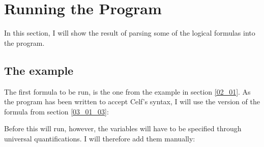 \section{Running the Program}
\label{04_03}

In this section, I will show the result of parsing some of the logical formulas into the program.

\subsection{The example}

The first formula to be run, is the one from the example in section \ref{02_01}. As the program has been written to accept Celf's syntax, I will use the version of the formula from section \ref{03_01_03}:

\begin{texto}
\end{texto}

 Before this will run, however, the variables will have to be specified through universal quantifications. I will therefore add them manually:

\begin{texto}
\end{texto}